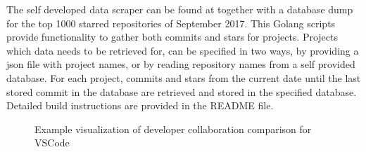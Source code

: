\documentclass[acmtog, authorversion]{acmart}
\begin{document}
The self developed data scraper can be found at \cite{githubvisualizerovertime} together with a database dump for the top 1000 starred repositories of September 2017.
This Golang scripts provide functionality to gather both commits and stars for projects.
Projects which data needs to be retrieved for, can be specified in two ways, by providing a json file with project names, or by reading repository names from a self provided database.
For each project, commits and stars from the current date until the last stored commit in the database are retrieved and stored in the specified database.
Detailed build instructions are provided in the README file.
\begin{figure}
\center
{}
\caption{Example visualization of developer collaboration comparison for VSCode}
\label{fig:collaboration}
\end{figure}
\end{document}
